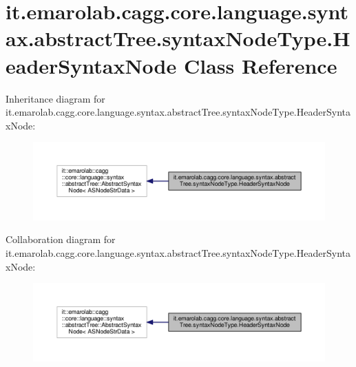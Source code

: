 \hypertarget{classit_1_1emarolab_1_1cagg_1_1core_1_1language_1_1syntax_1_1abstractTree_1_1syntaxNodeType_1_1HeaderSyntaxNode}{\section{it.\-emarolab.\-cagg.\-core.\-language.\-syntax.\-abstract\-Tree.\-syntax\-Node\-Type.\-Header\-Syntax\-Node Class Reference}
\label{classit_1_1emarolab_1_1cagg_1_1core_1_1language_1_1syntax_1_1abstractTree_1_1syntaxNodeType_1_1HeaderSyntaxNode}
}


Inheritance diagram for it.\-emarolab.\-cagg.\-core.\-language.\-syntax.\-abstract\-Tree.\-syntax\-Node\-Type.\-Header\-Syntax\-Node\-:\nopagebreak
\begin{figure}[H]
\begin{center}
\leavevmode
\includegraphics[width=350pt]{classit_1_1emarolab_1_1cagg_1_1core_1_1language_1_1syntax_1_1abstractTree_1_1syntaxNodeType_1_1HeaderSyntaxNode__inherit__graph}
\end{center}
\end{figure}


Collaboration diagram for it.\-emarolab.\-cagg.\-core.\-language.\-syntax.\-abstract\-Tree.\-syntax\-Node\-Type.\-Header\-Syntax\-Node\-:\nopagebreak
\begin{figure}[H]
\begin{center}
\leavevmode
\includegraphics[width=350pt]{classit_1_1emarolab_1_1cagg_1_1core_1_1language_1_1syntax_1_1abstractTree_1_1syntaxNodeType_1_1HeaderSyntaxNode__coll__graph}
\end{center}
\end{figure}
